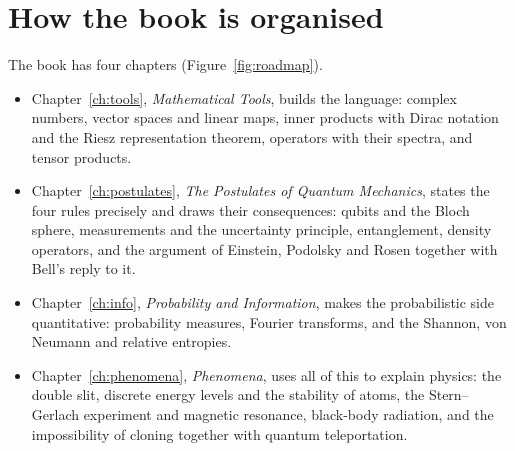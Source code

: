 \section*{How the book is organised}

The book has four chapters (Figure~\ref{fig:roadmap}).

\begin{itemize}
  \item Chapter~\ref{ch:tools}, \emph{Mathematical Tools}, builds the language: complex numbers, vector spaces and linear maps, inner products with Dirac notation and the Riesz representation theorem, operators with their spectra, and tensor products.
  \item Chapter~\ref{ch:postulates}, \emph{The Postulates of Quantum Mechanics}, states the four rules precisely and draws their consequences: qubits and the Bloch sphere, measurements and the uncertainty principle, entanglement, density operators, and the argument of Einstein, Podolsky and Rosen together with Bell's reply to it.
  \item Chapter~\ref{ch:info}, \emph{Probability and Information}, makes the probabilistic side quantitative: probability measures, Fourier transforms, and the Shannon, von Neumann and relative entropies.
  \item Chapter~\ref{ch:phenomena}, \emph{Phenomena}, uses all of this to explain physics: the double slit, discrete energy levels and the stability of atoms, the Stern--Gerlach experiment and magnetic resonance, black-body radiation, and the impossibility of cloning together with quantum teleportation.
\end{itemize}

